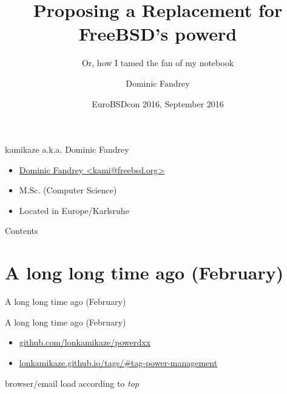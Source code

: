 \documentclass[aspectratio=169]{beamer}
\title{Proposing a Replacement for FreeBSD's powerd}
\subtitle{Or, how I tamed the fan of my notebook}
\author[D. Fandrey]{Dominic Fandrey}
\date[EuroBSDcon 2016]{EuroBSDcon 2016, September 2016}
\begin{document}
\begin{frame}[plain]
\titlepage
\end{frame}

\begin{frame}{kamikaze a.k.a. Dominic Fandrey}
\begin{itemize}
\item \href{mailto:kami@freebsd.org}{Dominic Fandrey <kami@freebsd.org>}
\item M.Sc. (Computer Science)
\item Located in Europe/Karlsruhe
\end{itemize}
\end{frame}

\begin{frame}{Contents}
\tableofcontents
\end{frame}

\section{A long long time ago (February)}

\begin{frame}{A long long time ago (February)}
\end{frame}

\begin{frame}{A long long time ago (February)}
\begin{itemize}
\item \href{https://github.com/lonkamikaze/powerdxx}{github.com/lonkamikaze/powerdxx}
\item \href{https://lonkamikaze.github.io/tags/\#tag-power-management}{lonkamikaze.github.io/tags/\#tag-power-management}
\end{itemize}
\end{frame}

\begin{frame}{browser/email load according to \emph{top}}
\end{frame}
\end{document}

